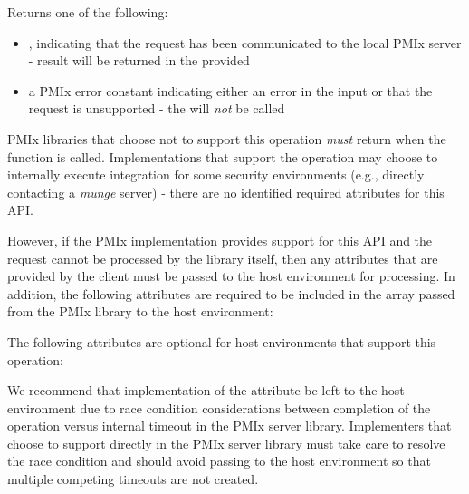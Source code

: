 \begin{arglist}
\end{arglist}

Returns one of the following:

\begin{itemize}
    \item {}, indicating that the request has been communicated to the local \ac{PMIx} server - result will be returned in the provided 
    \item a \ac{PMIx} error constant indicating either an error in the input or that the request is unsupported - the  will \textit{not} be called
\end{itemize}

\reqattrstart
\ac{PMIx} libraries that choose not to support this operation \textit{must} return  when the function is called. Implementations that support the operation may choose to internally execute integration for some security environments (e.g., directly contacting a \textit{munge} server) - there are no identified required attributes for this \ac{API}.

However, if the \ac{PMIx} implementation provides support for this \ac{API} and the request cannot be processed by the library itself, then any attributes that are provided by the client must be passed to the host environment for processing. In addition, the following attributes are required to be included in the  array passed from the \ac{PMIx} library to the host environment:


\reqattrend

\optattrstart
The following attributes are optional for host environments that support this operation:


\optattrend

\adviceimplstart
We recommend that implementation of the  attribute be left to the host environment due to race condition considerations between completion of the operation versus internal timeout in the \ac{PMIx} server library. Implementers that choose to support  directly in the \ac{PMIx} server library must take care to resolve the race condition and should avoid passing  to the host environment so that multiple competing timeouts are not created.
\adviceimplend


